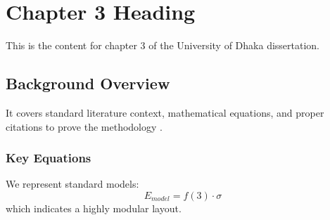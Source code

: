 \chapter{Chapter 3 Heading}
\label{ch:chapter3}
This is the content for chapter 3 of the University of Dhaka dissertation.

\section{Background Overview}
It covers standard literature context, mathematical equations, and proper citations to prove the methodology \cite{texbook}.

\subsection{Key Equations}
We represent standard models:
\begin{equation}
    E_{model} = f(3) \cdot \sigma
\end{equation}
which indicates a highly modular layout.

